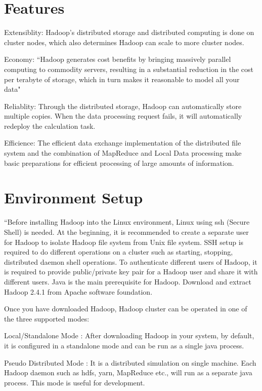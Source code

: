\section{Features}
Extensiblity: Hadoop's distributed storage and distributed computing is done on cluster nodes, which also determines Hadoop can scale to more cluster nodes.

Economy: ``Hadoop generates cost benefits by bringing massively parallel computing to commodity servers, resulting in a substantial reduction in the cost per terabyte of storage, which in turn makes it reasonable to model all your data"~\cite{hid-sp18-508-features}

Reliablity: Through the distributed storage, Hadoop can automatically store multiple copies. When the data processing request fails, it will automatically redeploy the calculation task.

Efficience: The efficient data exchange implementation of the distributed file system and the combination of MapReduce and Local Data processing make basic preparations for efficient processing of large amounts of information.


\section{Environment Setup}
``Before installing Hadoop into the Linux environment,  Linux using ssh (Secure Shell) is needed. At the beginning, it is recommended to create a separate user for Hadoop to isolate Hadoop file system from Unix file system. SSH setup is required to do different operations on a cluster such as starting, stopping, distributed daemon shell operations. To authenticate different users of Hadoop, it is required to provide public/private key pair for a Hadoop user and share it with different users. Java is the main prerequisite for Hadoop. Download and extract Hadoop 2.4.1 from Apache software foundation. 

Once you have downloaded Hadoop, Hadoop cluster can be operated in one of the three supported modes:

Local/Standalone Mode : After downloading Hadoop in your system, by default, it is configured in a standalone mode and can be run as a single java process.

Pseudo Distributed Mode : It is a distributed simulation on single machine. Each Hadoop daemon such as hdfs, yarn, MapReduce etc., will run as a separate java process. This mode is useful for development.

